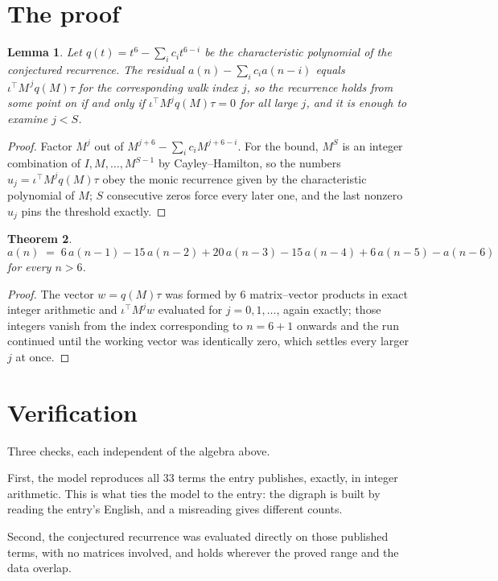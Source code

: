 \documentclass[11pt,a4paper]{article}
\theoremstyle{plain}
\newtheorem{theorem}{Theorem}
\newtheorem{lemma}[theorem]{Lemma}
\theoremstyle{definition}
\begin{document}
\section{The proof}

\begin{lemma}\label{lem:crit}
Let $q(t)=t^{6}-\sum_i c_it^{6-i}$ be the characteristic polynomial of the
conjectured recurrence. The residual $a(n)-\sum_ic_ia(n-i)$ equals
$\iota^{\!\top}M^{\,j}q(M)\tau$ for the corresponding walk index $j$, so the recurrence
holds from some point on if and only if $\iota^{\!\top}M^{j}q(M)\tau=0$ for all large $j$,
and it is enough to examine $j<S$.
\end{lemma}

\begin{proof}
Factor $M^{j}$ out of $M^{j+6}-\sum_ic_iM^{j+6-i}$. For the bound, $M^{S}$
is an integer combination of $I,M,\dots,M^{S-1}$ by Cayley--Hamilton, so the numbers
$u_j=\iota^{\!\top}M^{j}q(M)\tau$ obey the monic recurrence given by the characteristic
polynomial of $M$; $S$ consecutive zeros force every later one, and the last nonzero $u_j$
pins the threshold exactly.
\end{proof}

\begin{theorem}
\[
a(n)\;=\;6\,a(n-1) - 15\,a(n-2) + 20\,a(n-3) - 15\,a(n-4) + 6\,a(n-5) - a(n-6)
\]
for every $n>6$.
\end{theorem}

\begin{proof}
The vector $w=q(M)\tau$ was formed by $6$ matrix--vector products in exact integer
arithmetic and $\iota^{\!\top}M^{j}w$ evaluated for $j=0,1,\dots$, again exactly; those
integers vanish from the index corresponding to $n=6+1$ onwards and the run continued
until the working vector was identically zero, which settles every larger $j$ at once.
\end{proof}

\section{Verification}

Three checks, each independent of the algebra above.

First, the model reproduces all $33$ terms the entry publishes, exactly, in integer
arithmetic. This is what ties the model to the entry: the digraph is built by reading the
entry's English, and a misreading gives different counts.

Second, the conjectured recurrence was evaluated directly on those published terms, with no
matrices involved, and holds wherever the proved range and the data overlap.
\end{document}
